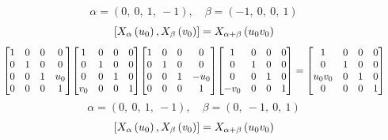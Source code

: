 \documentclass[11pt]{article}
\theoremstyle{definition}
\begin{document}
\[
\alpha = \left( 0, \  0, \  1, \  -1\right), \quad \beta = \left( -1, \  0, \  0, \  1\right)
\]
\[
\scaletoalign{\textwidth}{\left[ X_{\alpha}\left(u_{0}\right), X_{\beta}\left(v_{0}\right) \right] = X_{\alpha + \beta}\left(u_{0} v_{0}\right)}
\]
\[
\scaletoalign{\textwidth}{{\left[\begin{matrix}1 & 0 & 0 & 0\\0 & 1 & 0 & 0\\0 & 0 & 1 & u_{0}\\0 & 0 & 0 & 1\end{matrix}\right]} {\left[\begin{matrix}1 & 0 & 0 & 0\\0 & 1 & 0 & 0\\0 & 0 & 1 & 0\\v_{0} & 0 & 0 & 1\end{matrix}\right]} {\left[\begin{matrix}1 & 0 & 0 & 0\\0 & 1 & 0 & 0\\0 & 0 & 1 & - u_{0}\\0 & 0 & 0 & 1\end{matrix}\right]} {\left[\begin{matrix}1 & 0 & 0 & 0\\0 & 1 & 0 & 0\\0 & 0 & 1 & 0\\- v_{0} & 0 & 0 & 1\end{matrix}\right]} = {\left[\begin{matrix}1 & 0 & 0 & 0\\0 & 1 & 0 & 0\\u_{0} v_{0} & 0 & 1 & 0\\0 & 0 & 0 & 1\end{matrix}\right]}}
\]
\[
\alpha = \left( 0, \  0, \  1, \  -1\right), \quad \beta = \left( 0, \  -1, \  0, \  1\right)
\]
\[
\scaletoalign{\textwidth}{\left[ X_{\alpha}\left(u_{0}\right), X_{\beta}\left(v_{0}\right) \right] = X_{\alpha + \beta}\left(u_{0} v_{0}\right)}
\]
\end{document}
